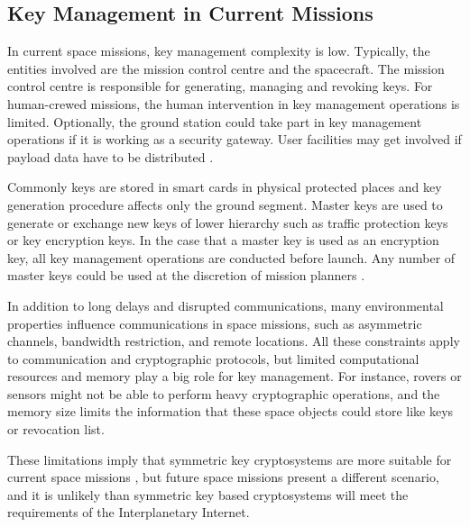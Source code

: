  
 



\subsection{Key Management in Current Missions}

In current space missions, key management complexity is low. Typically, the entities involved are the mission control centre and the spacecraft. The mission control centre is responsible for generating, managing and revoking keys. For human-crewed missions, the human intervention in key management operations is limited. Optionally, the ground station could take part in key management operations if it is working as a security gateway. User facilities may get involved if payload data have to be distributed \cite{book2011space}. 


Commonly keys are stored in smart cards in physical protected places and key generation procedure affects only the ground segment. Master keys are used to generate or exchange new keys of lower hierarchy such as traffic protection keys or key encryption keys. In the case that a master key is used as an encryption key, all key management operations are conducted before launch. Any number of master keys could be used at the discretion of mission planners \cite{book2011space}.

In addition to long delays and disrupted communications, many environmental properties influence communications in space missions, such as asymmetric channels, bandwidth restriction, and remote locations. All these constraints apply to communication and cryptographic protocols, but limited computational resources and memory play a big role for key management. For instance, rovers or sensors might not be able to perform heavy cryptographic operations, and the memory size limits the information that these space objects could store like keys or revocation list.

These limitations imply that symmetric key cryptosystems are more suitable for current space missions \cite{book2011space}, but future space missions present a different scenario, and it is unlikely than symmetric key based cryptosystems will meet the requirements of the Interplanetary Internet.


